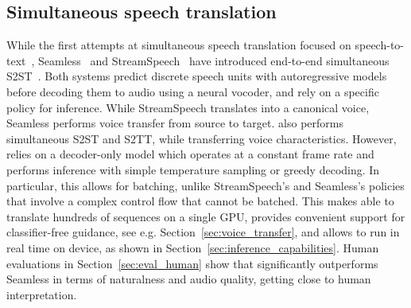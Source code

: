 \subsection{Simultaneous speech translation}
While the first attempts at simultaneous speech translation focused on speech-to-text~\citep{ren-etal-2020-simulspeech, ma_streaming_21, real_trans_21}, Seamless~\cite{seamless} and StreamSpeech~\cite{streamspeech} have introduced end-to-end simultaneous S2ST~\cite{real_trans_21,seamless,streamspeech}. Both systems predict discrete speech units with autoregressive models before decoding them to audio using a neural vocoder, and rely on a specific policy for inference. While StreamSpeech translates into a canonical voice, Seamless performs voice transfer from source to target. \ours also performs simultaneous S2ST and S2TT, while transferring voice characteristics. However, \ours relies on a decoder-only model which operates at a constant frame rate and performs inference with simple temperature sampling or greedy decoding. In particular, this allows for batching, unlike StreamSpeech's and Seamless's policies that involve a complex control flow that cannot be batched.
This makes \ours able to translate hundreds of sequences on a single GPU, provides
convenient support for classifier-free guidance, see e.g. Section~\ref{sec:voice_transfer}, and allows to run in real time on device, as shown in Section~\ref{sec:inference_capabilities}.
Human evaluations in Section~\ref{sec:eval_human} show that \ours significantly outperforms Seamless in terms of naturalness and audio quality, getting close to human interpretation.

